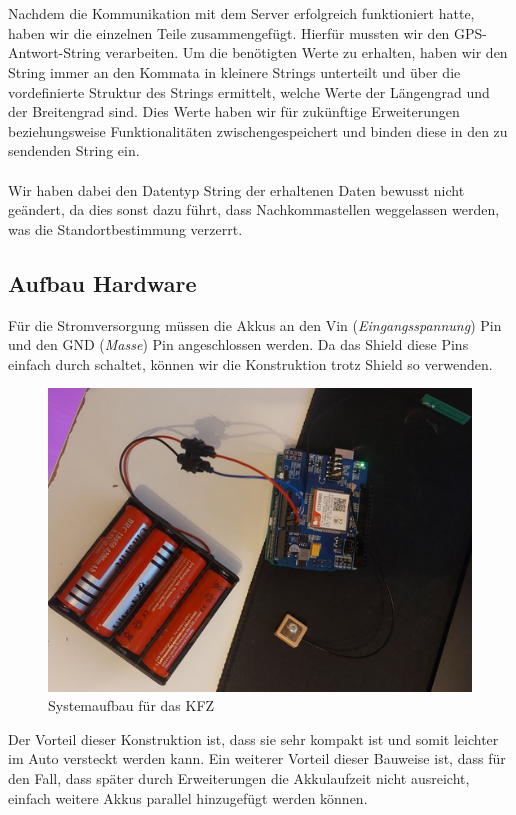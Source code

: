 \\
\\
Nachdem die Kommunikation mit dem Server erfolgreich funktioniert hatte, haben wir die einzelnen Teile zusammengefügt. Hierfür mussten wir den GPS-Antwort-String verarbeiten. Um die benötigten Werte zu erhalten, haben wir den String immer an den Kommata in kleinere Strings unterteilt und über die vordefinierte Struktur des Strings ermittelt, welche Werte der Längengrad und der Breitengrad sind. Dies Werte haben wir für zukünftige Erweiterungen beziehungsweise Funktionalitäten zwischengespeichert und binden diese in den zu sendenden String ein.
\\
\\
Wir haben dabei den Datentyp String der erhaltenen Daten bewusst nicht geändert, da dies sonst dazu führt, dass Nachkommastellen weggelassen werden, was die Standortbestimmung verzerrt.
\subsection{Aufbau Hardware}
Für die Stromversorgung müssen die Akkus an den Vin (\textit{Eingangsspannung}) Pin und den GND (\textit{Masse}) Pin angeschlossen werden. Da das Shield diese Pins einfach durch schaltet, können wir die Konstruktion trotz Shield so verwenden.
\begin{figure} [H]
	\begin{center}
		\includegraphics[width=1\textwidth]{Bilder/Arduino_Aufbau.png}
		\caption{Systemaufbau für das KFZ}
		\label{hw-system}
	\end{center}
\end{figure}
Der Vorteil dieser Konstruktion ist, dass sie sehr kompakt ist und somit leichter im Auto versteckt werden kann. Ein weiterer Vorteil dieser Bauweise ist, dass für den Fall, dass später durch Erweiterungen die Akkulaufzeit nicht ausreicht, einfach weitere Akkus parallel hinzugefügt werden können.

